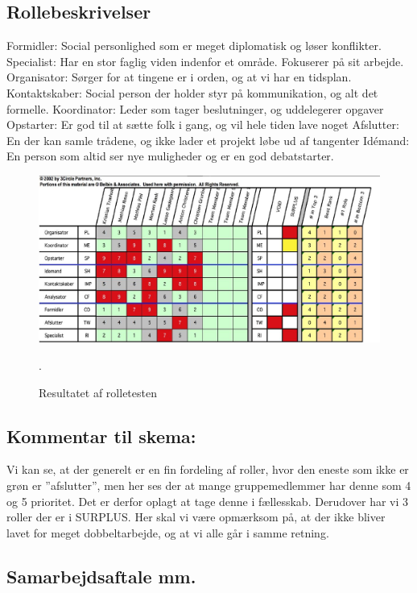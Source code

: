 \documentclass[oneside,a4paper,titlepage]{article}
\begin{document}
\begin{itemize}
\subsection*{Rollebeskrivelser}
Formidler: Social personlighed som er meget diplomatisk og løser konflikter.
Specialist: Har en stor faglig viden indenfor et område. Fokuserer på sit arbejde.
Organisator: Sørger for at tingene er i orden, og at vi har en tidsplan.
Kontaktskaber: Social person der holder styr på kommunikation, og alt det formelle.
Koordinator: Leder som tager beslutninger, og uddelegerer opgaver
Opstarter: Er god til at sætte folk i gang, og vil hele tiden lave noget
Afslutter: En der kan samle trådene, og ikke lader et projekt løbe ud af tangenter
Idémand: En person som altid ser nye muligheder og er en god debatstarter.

\begin{figure}[H]
   \centering
   \includegraphics[width=15cm]{graphics/rolletest}
   \caption{Resultatet af rolletesten}.
\end{figure}

\subsection*{Kommentar til skema:}
Vi kan se, at der generelt er en fin fordeling af roller, hvor den eneste som ikke er grøn er ”afslutter”, men her ses der at mange gruppemedlemmer har denne som 4 og 5 prioritet. Det er derfor oplagt at tage denne i fællesskab. Derudover har vi 3 roller der er i SURPLUS. Her skal vi være opmærksom på, at der ikke bliver lavet for meget dobbeltarbejde, og at vi alle går i samme retning.

\subsection{Samarbejdsaftale mm.}
\label{sec:samarbejdsaftale}


\end{itemize}
\end{document}

